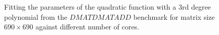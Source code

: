 \vspace{\baselineskip}	
\begin{figure}[H]
	\centering
	\caption{Fitting the parameters of the quadratic function with a $3$rd degree polynomial from the $DMATDMATADD$ benchmark for matrix size $690\times690$ against different number of cores.}	
	\label{fig15}
\end{figure}

